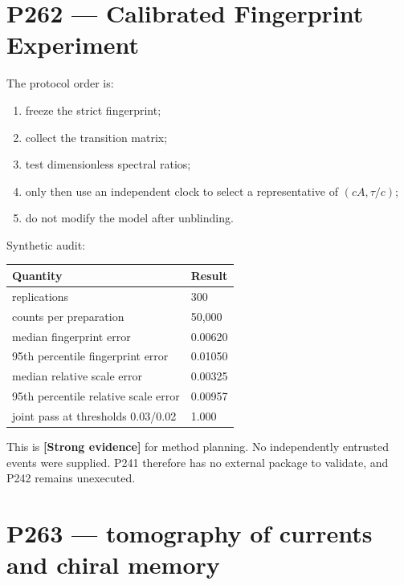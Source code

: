 \documentclass[11pt,a4paper,openany]{report}
\newcommand{\statusStrong}{\textcolor{finblue}{[Strong evidence]}}
\begin{document}
\chapter{P262 --- Calibrated Fingerprint Experiment}

The protocol order is:

\begin{enumerate}
\item 
freeze the strict fingerprint;

\item 
collect the transition matrix;

\item 
test dimensionless spectral ratios;

\item 
only then use an independent clock to select a representative of \((cA,\tau/c)\);

\item 
do not modify the model after unblinding.

\end{enumerate}

Synthetic audit:

\begin{center}
\begingroup\small
\setlength{\tabcolsep}{2.5pt}
\renewcommand{\arraystretch}{1.16}
\begin{longtable}{@{}p{}p{}@{}}
\toprule
\textbf{Quantity} & \textbf{Result} \\
\midrule
\endhead
replications & 300 \\
counts per preparation & 50,000 \\
median fingerprint error & 0.00620 \\
95th percentile fingerprint error & 0.01050 \\
median relative scale error & 0.00325 \\
95th percentile relative scale error & 0.00957 \\
joint pass at thresholds 0.03/\allowbreak{}0.02 & 1.000 \\
\bottomrule
\end{longtable}
\endgroup
\end{center}

This is \textbf{\statusStrong{}} for method planning. No independently entrusted events were supplied. P241 therefore has no external package to validate, and P242 remains unexecuted.

\chapter{P263 --- tomography of currents and chiral memory}
\end{document}
